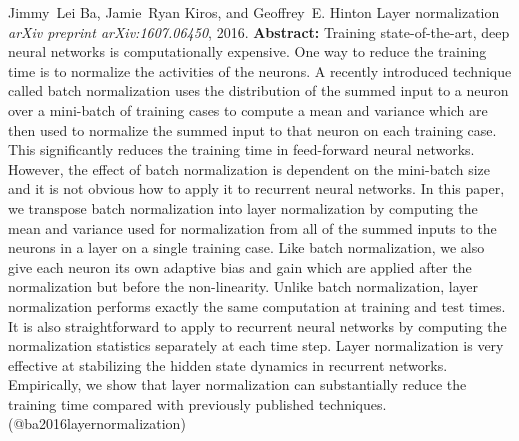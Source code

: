 \documentclass{article} %
\begin{document}
\begin{thebibliography}{}
 Jimmy~Lei Ba, Jamie~Ryan Kiros, and Geoffrey~E. Hinton \newblock Layer normalization \newblock \emph{arXiv preprint arXiv:1607.06450}, 2016. \newblock \textbf{Abstract:} Training state-of-the-art, deep neural networks is computationally expensive. One way to reduce the training time is to normalize the activities of the neurons. A recently introduced technique called batch normalization uses the distribution of the summed input to a neuron over a mini-batch of training cases to compute a mean and variance which are then used to normalize the summed input to that neuron on each training case. This significantly reduces the training time in feed-forward neural networks. However, the effect of batch normalization is dependent on the mini-batch size and it is not obvious how to apply it to recurrent neural networks. In this paper, we transpose batch normalization into layer normalization by computing the mean and variance used for normalization from all of the summed inputs to the neurons in a layer on a single training case. Like batch normalization, we also give each neuron its own adaptive bias and gain which are applied after the normalization but before the non-linearity. Unlike batch normalization, layer normalization performs exactly the same computation at training and test times. It is also straightforward to apply to recurrent neural networks by computing the normalization statistics separately at each time step. Layer normalization is very effective at stabilizing the hidden state dynamics in recurrent networks. Empirically, we show that layer normalization can substantially reduce the training time compared with previously published techniques. \newblock (@ba2016layernormalization)


\end{thebibliography}
\end{document}

